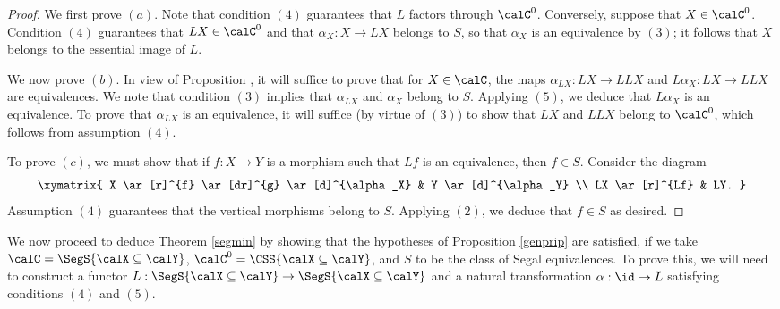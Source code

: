 \begin{proof}
We first prove $(a)$. Note that condition $(4)$ guarantees that $L$ factors through
$\calC^0$. Conversely, suppose that $X \in \calC^0$. Condition $(4)$ guarantees that
$LX \in \calC^0$ and that $\alpha_X: X \rightarrow LX$ belongs to $S$, so that
$\alpha_X$ is an equivalence by $(3)$; it follows that $X$ belongs to the essential image of
$L$.

We now prove $(b)$. In view of Proposition , it will suffice to prove that
for $X \in \calC$, the maps $\alpha_{LX}: LX \rightarrow LLX$ and $L \alpha_X: LX
\rightarrow LLX$ are equivalences. We note that condition $(3)$ implies that
$\alpha_{LX}$ and $\alpha_X$ belong to $S$. Applying $(5)$, we deduce that $L \alpha_X$
is an equivalence. To prove that $\alpha_{LX}$ is an equivalence, it will suffice (by virtue
of $(3)$) to show that $LX$ and $LLX$ belong to $\calC^0$, which follows from assumption $(4)$.

To prove $(c)$, we must show that if $f: X \rightarrow Y$ is a morphism such that $Lf$ is an equivalence, then $f \in S$. Consider the diagram
$$ \xymatrix{ X \ar[r]^{f} \ar[dr]^{g} \ar[d]^{\alpha_X} & Y \ar[d]^{\alpha_Y} \\
LX \ar[r]^{Lf} & LY. }$$
Assumption $(4)$ guarantees that the vertical morphisms belong to $S$. Applying
$(2)$, we deduce that $f \in S$ as desired.
\end{proof}

We now proceed to deduce Theorem \ref{segmin} by showing that the hypotheses of Proposition \ref{genprip} are satisfied, if we take $\calC = \SegS{ \calX \subseteq \calY}$, $\calC^{0} = \CSS{ \calX \subseteq \calY}$, and $S$ to be the class of Segal equivalences. To prove this, we will need to construct
a functor $L: \SegS{ \calX \subseteq \calY} \rightarrow \SegS{ \calX \subseteq \calY}$ and a natural
transformation $\alpha: \id \rightarrow L$ satisfying conditions $(4)$ and $(5)$.

